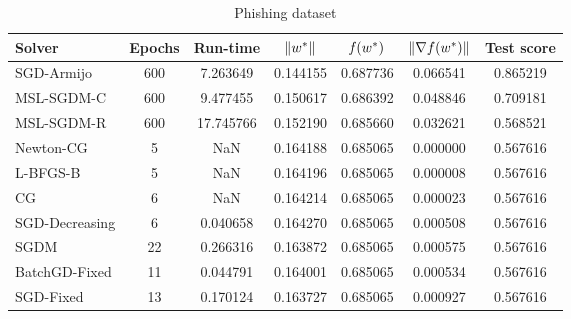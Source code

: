 \begin{table}
\caption{Phishing dataset}
\label{tab:phish-tab}
\centering
\begin{tabular}{lS[drop-zero-decimal]S[round-precision=4]S[round-precision=6]S[round-precision=6]S[exponent-mode=scientific]S[round-precision=6]}
\toprule
Solver & {Epochs} & {Run-time} & {$\lVert w^\ast\rVert$} & {$\operatorname*{\mathit{f}}(w^\ast)$} & {$\lVert\nabla f(w^\ast)\rVert$} & {Test score} \\
\midrule
SGD-Armijo & 600 & 7.263649 & 0.144155 & 0.687736 & 0.066541 & 0.865219 \\
MSL-SGDM-C & 600 & 9.477455 & 0.150617 & 0.686392 & 0.048846 & 0.709181 \\
MSL-SGDM-R & 600 & 17.745766 & 0.152190 & 0.685660 & 0.032621 & 0.568521 \\
Newton-CG & 5 & NaN & 0.164188 & 0.685065 & 0.000000 & 0.567616 \\
L-BFGS-B & 5 & NaN & 0.164196 & 0.685065 & 0.000008 & 0.567616 \\
CG & 6 & NaN & 0.164214 & 0.685065 & 0.000023 & 0.567616 \\
SGD-Decreasing & 6 & 0.040658 & 0.164270 & 0.685065 & 0.000508 & 0.567616 \\
SGDM & 22 & 0.266316 & 0.163872 & 0.685065 & 0.000575 & 0.567616 \\
BatchGD-Fixed & 11 & 0.044791 & 0.164001 & 0.685065 & 0.000534 & 0.567616 \\
SGD-Fixed & 13 & 0.170124 & 0.163727 & 0.685065 & 0.000927 & 0.567616 \\
\bottomrule
\end{tabular}
\end{table}

